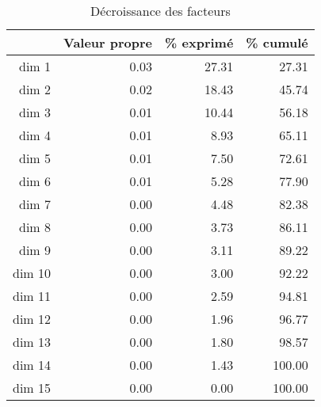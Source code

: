 \begin{table}[ht]
\centering
\begin{tabular}{rrrr}
  \toprule
 & Valeur propre & \% exprimé  & \% cumulé  \\ 
  \midrule
dim 1 & 0.03 & 27.31 & 27.31 \\ 
  dim 2 & 0.02 & 18.43 & 45.74 \\ 
  dim 3 & 0.01 & 10.44 & 56.18 \\ 
  dim 4 & 0.01 & 8.93 & 65.11 \\ 
  dim 5 & 0.01 & 7.50 & 72.61 \\ 
  dim 6 & 0.01 & 5.28 & 77.90 \\ 
  dim 7 & 0.00 & 4.48 & 82.38 \\ 
  dim 8 & 0.00 & 3.73 & 86.11 \\ 
  dim 9 & 0.00 & 3.11 & 89.22 \\ 
  dim 10 & 0.00 & 3.00 & 92.22 \\ 
  dim 11 & 0.00 & 2.59 & 94.81 \\ 
  dim 12 & 0.00 & 1.96 & 96.77 \\ 
  dim 13 & 0.00 & 1.80 & 98.57 \\ 
  dim 14 & 0.00 & 1.43 & 100.00 \\ 
  dim 15 & 0.00 & 0.00 & 100.00 \\ 
   \bottomrule
\end{tabular}
\caption{Décroissance des facteurs} 
\end{table}

